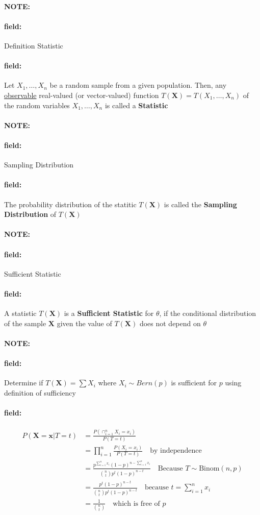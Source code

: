\documentclass[12pt]{article}
\newenvironment{note}{\paragraph{NOTE:}}{}
\newenvironment{field}{\paragraph{field:}}{}
\begin{document}
\begin{note}
  \begin{field}
    Definition Statistic
  \end{field}
  \begin{field}
    Let $X_1, \ldots, X_n$ be a random sample from a given population. Then, any \underline{observable} real-valued (or vector-valued) function $T(\mathbf{X}) = T(X_1, \ldots, X_n)$ of the random variables $X_1, \ldots, X_n$ is called a \textbf{Statistic}
  \end{field}
\end{note}

\begin{note}
  \begin{field}
    Sampling Distribution
  \end{field}
  \begin{field}
    The probability distribution of the statitic $T(\mathbf{X})$ is called the \textbf{Sampling Distribution} of $T(\mathbf{X})$
  \end{field}
\end{note}


\begin{note}
  \begin{field}
    Sufficient Statistic
  \end{field}
  \begin{field}
    A statistic $T(\mathbf{X})$ is a \textbf{Sufficient Statistic} for $\theta$, if the conditional distribution of the sample $\mathbf{X}$ given the value of $T(\mathbf{X})$ does not depend on $\theta$
  \end{field}
\end{note}

\begin{note}
  \begin{field}
    Determine if $T(\mathbf{X}) = \sum X_i$ where $X_i\sim Bern(p)$ is sufficient for $p$ using definition of sufficiency
  \end{field}
  \begin{field}
    \begin{align*}
      P(\mathbf{X} = \mathbf{x}\big| T = t) &= \frac{P(\cap_{i = 1}^n X_i = x_i)}{P(T = t)}\\
      &= \prod_{i = 1}^n \frac{P(X_i = x_i)}{P(T = t)} \quad \text{by independence}\\
      &= \frac{p^{\sum_{i = 1}^n x_i}(1 - p)^{n - \sum_{i = 1}^n x_i}}{\binom{n}{t}p^t(1 -p)^{n-t}} \quad \text{Because } T \sim \text{Binom}(n,p)\\
      &= \frac{p^t(1-p)^{n-t}}{\binom{n}{t}p^t(1-p)^{n-t}} \quad \text{because }t = \sum_{i = 1}^n x_i\\
      &= \frac{1}{\binom{n}{t}} \quad \text{which is free of  }p
    \end{align*}
  \end{field}
\end{note}
\end{document}
